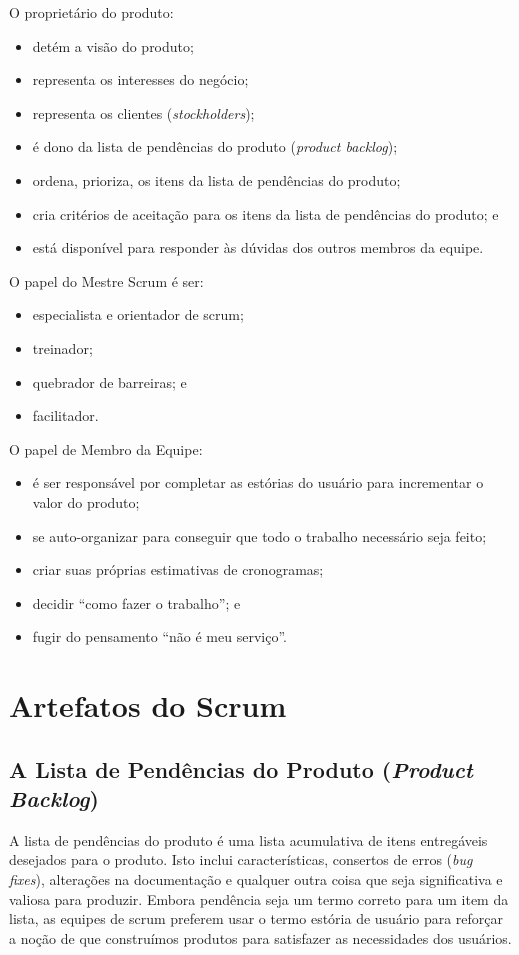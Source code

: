 O proprietário do produto:
\begin{itemize}
\item detém a visão do produto;
\item representa os interesses do negócio;
\item representa os clientes (\textit{stockholders});
\item é dono da lista de pendências do produto (\textit{product backlog});
\item ordena, prioriza, os itens da lista de pendências do produto;
\item cria critérios de aceitação para os itens da lista de pendências do produto; e
\item está disponível para responder às dúvidas dos outros membros da equipe.
\end{itemize}

O papel do Mestre Scrum é ser:
\begin{itemize}
\item especialista e orientador de scrum;
\item treinador;
\item quebrador de barreiras; e
\item facilitador.
\end{itemize}

O papel de Membro da Equipe:
\begin{itemize}
\item é ser responsável por completar as estórias do usuário para incrementar o valor do produto;
\item se auto-organizar para conseguir que todo o trabalho necessário seja feito;
\item criar suas próprias estimativas de cronogramas;
\item decidir ``como fazer o trabalho''; e
\item fugir do pensamento ``não é meu serviço''.
\end{itemize}

\section{Artefatos do Scrum}
\subsection{A Lista de Pendências do Produto (\emph{Product Backlog})}
A lista de pendências do produto é uma lista acumulativa de itens entregáveis desejados para o produto. Isto inclui características, consertos de erros (\emph{bug fixes}), alterações na documentação e qualquer outra coisa que seja significativa e valiosa para produzir. Embora pendência seja um termo correto para um item da lista, as equipes de scrum preferem usar o termo estória de usuário para reforçar a noção de que construímos produtos para satisfazer as necessidades dos usuários.

